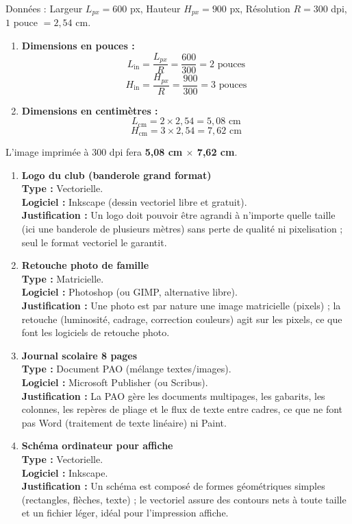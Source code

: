 \documentclass[11pt]{article}
\newcommand{\cle}[1]{{\popxbold\color{popdark}#1}}
\begin{document}
\begin{corrige}
Données : Largeur $L_{px} = 600$ px, Hauteur $H_{px} = 900$ px, Résolution $R = 300$ dpi, $1$ pouce $= 2,54$ cm.

\begin{enumerate}
\item \textbf{Dimensions en pouces :}
\[
L_{\text{in}} = \frac{L_{px}}{R} = \frac{600}{300} = 2 \text{ pouces}
\]
\[
H_{\text{in}} = \frac{H_{px}}{R} = \frac{900}{300} = 3 \text{ pouces}
\]
\item \textbf{Dimensions en centimètres :}
\[
L_{\text{cm}} = 2 \times 2,54 = 5,08 \text{ cm}
\]
\[
H_{\text{cm}} = 3 \times 2,54 = 7,62 \text{ cm}
\]
\end{enumerate}
L'image imprimée à 300 dpi fera \textbf{5,08 cm $\times$ 7,62 cm}.
\end{corrige}

\begin{corrige}
\begin{enumerate}
\item \textbf{Logo du club (banderole grand format)} \\
\textbf{Type :} \cle{Vectorielle}. \\
\textbf{Logiciel :} \cle{Inkscape} (dessin vectoriel libre et gratuit). \\
\textbf{Justification :} Un logo doit pouvoir être agrandi à n'importe quelle taille (ici une banderole de plusieurs mètres) sans perte de qualité ni pixelisation ; seul le format vectoriel le garantit.
\item \textbf{Retouche photo de famille} \\
\textbf{Type :} \cle{Matricielle}. \\
\textbf{Logiciel :} \cle{Photoshop} (ou GIMP, alternative libre). \\
\textbf{Justification :} Une photo est par nature une image matricielle (pixels) ; la retouche (luminosité, cadrage, correction couleurs) agit sur les pixels, ce que font les logiciels de retouche photo.
\item \textbf{Journal scolaire 8 pages} \\
\textbf{Type :} Document \cle{PAO} (mélange textes/images). \\
\textbf{Logiciel :} \cle{Microsoft Publisher} (ou Scribus). \\
\textbf{Justification :} La PAO gère les documents multipages, les gabarits, les colonnes, les repères de pliage et le flux de texte entre cadres, ce que ne font pas Word (traitement de texte linéaire) ni Paint.
\item \textbf{Schéma ordinateur pour affiche} \\
\textbf{Type :} \cle{Vectorielle}. \\
\textbf{Logiciel :} \cle{Inkscape}. \\
\textbf{Justification :} Un schéma est composé de formes géométriques simples (rectangles, flèches, texte) ; le vectoriel assure des contours nets à toute taille et un fichier léger, idéal pour l'impression affiche.
\end{enumerate}
\end{corrige}
\end{document}
